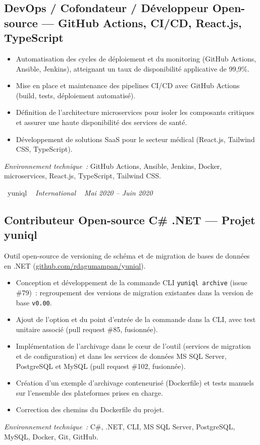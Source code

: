 \documentclass[10pt,a4paper]{article}
\begin{document}
\subsection*{DevOps / Cofondateur / Développeur Open-source --- GitHub Actions, CI/CD, React.js, TypeScript}
\color{darkgray}
\begin{itemize}
  \item Automatisation des cycles de déploiement et du monitoring (GitHub Actions, Ansible, Jenkins), atteignant un taux de disponibilité applicative de 99,9\%.
  \item Mise en place et maintenance des pipelines CI/CD avec GitHub Actions (build, tests, déploiement automatisé).
  \item Définition de l'architecture microservices pour isoler les composants critiques et assurer une haute disponibilité des services de santé.
  \item Développement de solutions SaaS pour le secteur médical (React.js, Tailwind CSS, TypeScript).
\end{itemize}
\textit{Environnement technique~:} GitHub Actions, Ansible, Jenkins, Docker, microservices, React.js, TypeScript, Tailwind CSS.

\vspace{10pt}

\noindent\textcolor{primary}{ \faBuilding\ yuniql} \quad
\textit{ \small \textcolor{darkgray}{ \faMapMarker\ } International } \hfill
\textit{ \small \textcolor{darkgray}{ \faCalendar\ } Mai 2020 -- Juin 2020 }

\vspace{4pt}

\subsection*{Contributeur Open-source C\# .NET --- Projet yuniql}
\color{darkgray}
Outil open-source de versioning de schéma et de migration de bases de données en .NET (\href{https://github.com/rdagumampan/yuniql}{github.com/rdagumampan/yuniql}).
\begin{itemize}
  \item Conception et développement de la commande CLI \texttt{yuniql archive} (issue \#79)~: regroupement des versions de migration existantes dans la version de base \texttt{v0.00}.
  \item Ajout de l'option et du point d'entrée de la commande dans la CLI, avec test unitaire associé (pull request \#85, fusionnée).
  \item Implémentation de l'archivage dans le cœur de l'outil (services de migration et de configuration) et dans les services de données MS SQL Server, PostgreSQL et MySQL (pull request \#102, fusionnée).
  \item Création d'un exemple d'archivage conteneurisé (Dockerfile) et tests manuels sur l'ensemble des plateformes prises en charge.
  \item Correction des chemins du Dockerfile du projet.
\end{itemize}
\textit{Environnement technique~:} C\#, .NET, CLI, MS SQL Server, PostgreSQL, MySQL, Docker, Git, GitHub.
\end{document}
